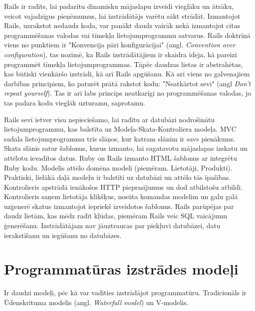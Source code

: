 Rails ir radīts, lai padarītu dinamisku mājaslapu izveidi vieglāku un ātrāku, veicot vajadzīgus pieņēmumus, lai izstrādātājs varētu sākt strādāt. Izmantojot Rails, uzrakstot nedaudz koda, var panākt daudz vairāk nekā izmantojot citas programmēšanas valodas vai tīmekļa lietojumprogrammu satvarus. Rails doktrīnā viens no punktiem ir "Konvencija pāri konfigurācijai" (angl. \textit{Convention over configuration}), tas nozīmē, ka Rails izstrādātājiem ir skaidra ideja, kā pareizi programmēt tīmekļa lietojumprogrammas. Tāpēc daudzas lietas ir abstrahētas, kas būtiski vienkāršo izstrādi, kā arī Rails apgūšanu. Kā arī viens no galvenajiem darbības principiem, ko paturēt prātā rakstot kodu: "Neatkārtot sevi" (angl \textit{Don't repeat yourself}). Tas ir arī labs princips neatkarīgi no programmēšanas valodas, jo tas padara kodu vieglāk uzturamu, saprotamu.
\cite{hartlRails} \cite{rails-guides}

Rails sevī ietver visu nepieciešamo, lai radītu ar datubāzi nodrošinātu lietojumprogrammu, kas balstīta uz Modeļa-Skata-Kontroliera  modeļa.
MVC sadala lietojumprogrammu trīs slāņos, kur katram slānim ir savs pienākums.
Skata slānis satur šablonus, kurus izmanto, lai sagatavotu mājaslapas izskatu un attēlotu ievadītos datus. Ruby on Rails izmanto HTML šablonus ar integrētu Ruby kodu.
Modelis attēlo domēna modeli (piemēram. Lietotāji, Produkti). Praktiski, lielākā daļā modeļu ir balstīti uz datubāzi un attēlo tās īpašības.
Kontrolieris apstrādā ienākošos HTTP pieprasījumus un dod atbilstošu atbildi. Kontrolieris saņem lietotāja klikšķus, nosūta komandas modelim un galu galā uzģenerē skatus izmantojot iepriekš izveidotos šablonus.
\cite{rails-api}
Rails parūpējas par daudz lietām, kas mēdz radīt kļūdas, piemēram Rails veic SQL vaicājumu ģenerēšanu. Izstrādātājam nav jāuztraucas par piekļuvi datubāzei, datu ierakstīšanu un iegūšanu no datubāzes.

\chapter{Programmatūras izstrādes modeļi}
Ir daudzi modeļi, pēc kā var vadīties izstrādājot programmatūru. Tradicionāls ir Ūdenskrituma modelis (angl. \textit{Waterfall model}) un V-modelis.
